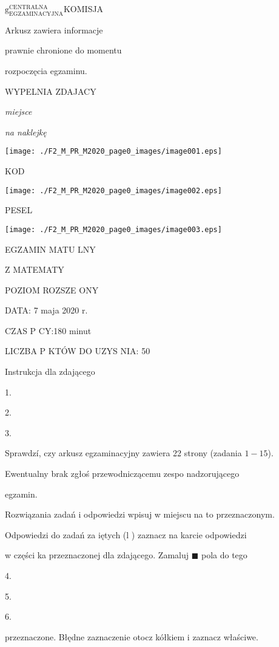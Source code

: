 \documentclass[a4paper,12pt]{article}
\begin{document}
$\mathrm{g}_{\mathrm{E}\mathrm{G}\mathrm{Z}\mathrm{A}\mathrm{M}\mathrm{I}\mathrm{N}\mathrm{A}\mathrm{C}\mathrm{Y}\mathrm{J}\mathrm{N}\mathrm{A}}^{\mathrm{C}\mathrm{E}\mathrm{N}\mathrm{T}\mathrm{R}\mathrm{A}\mathrm{L}\mathrm{N}\mathrm{A}}$KOMISJA

Arkusz zawiera informacje

prawnie chronione do momentu

rozpoczęcia egzaminu.

WYPELNIA ZDAJACY

{\it miejsce}

{\it na naklejkę}
\begin{center}
\texttt{[image: ./F2\_M\_PR\_M2020\_page0\_images/image001.eps]}
\end{center}
KOD
\begin{center}
\texttt{[image: ./F2\_M\_PR\_M2020\_page0\_images/image002.eps]}
\end{center}
PESEL
\begin{center}
\texttt{[image: ./F2\_M\_PR\_M2020\_page0\_images/image003.eps]}
\end{center}
EGZAMIN MATU  LNY

Z MATEMATY

POZIOM ROZSZE ONY

DATA: 7 maja 2020 r.

CZAS P CY:180 minut

LICZBA P KTÓW DO UZYS NIA: 50

Instrukcja dla zdającego

1.

2.

3.

Sprawdzí, czy arkusz egzaminacyjny zawiera 22 strony (zadania $1-15$).

Ewentualny brak zgłoś przewodniczącemu zespo nadzorującego

egzamin.

Rozwiązania zadań i odpowiedzi wpisuj w miejscu na to przeznaczonym.

Odpowiedzi do zadań za iętych (l ) zaznacz na karcie odpowiedzi

w części ka przeznaczonej dla zdającego. Zamaluj $\blacksquare$ pola do tego

4.

5.

6.

przeznaczone. Błędne zaznaczenie otocz kółkiem i zaznacz właściwe.
\end{document}
